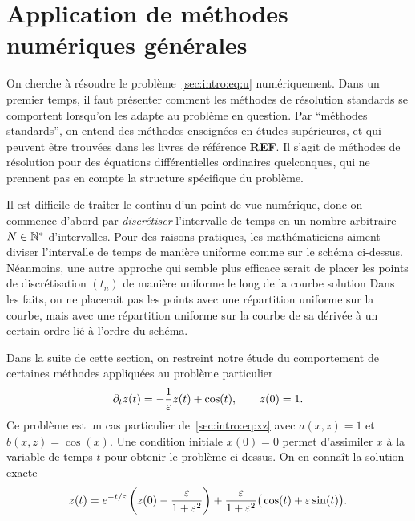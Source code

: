 \section*{Application de méthodes numériques générales}

On cherche à résoudre le problème~\eqref{sec:intro:eq:u} numériquement.
Dans un premier temps, il faut présenter comment les méthodes de
résolution standards se comportent lorsqu'on les adapte au problème en
question. Par \enquote{méthodes standards}, on entend des méthodes
enseignées en études supérieures, et qui peuvent être trouvées dans les
livres de référence \textbf{REF}. Il
s'agit de méthodes de résolution pour des équations différentielles
ordinaires quelconques, qui ne prennent pas en compte la structure
spécifique du problème. 


Il est difficile de traiter le continu d'un point de vue numérique, donc
on commence d'abord par \textit{discrétiser} l'intervalle de temps en un
nombre arbitraire $N \in \mathbb{N}^*$ d'intervalles.
%
%
\noindent%
Pour des raisons pratiques, les mathématiciens aiment diviser
l'intervalle de temps de manière uniforme comme sur le schéma ci-dessus.
Néanmoins, une autre approche qui semble plus efficace serait de placer
les points de discrétisation $(t_n)$ de manière uniforme le long de la
courbe solution 
%
%
\noindent%
Dans les faits, on ne placerait pas les points avec une répartition
uniforme sur la courbe, mais avec une répartition uniforme sur la courbe
de sa dérivée à un certain ordre lié à l'ordre du
schéma.


Dans la suite de cette section, on restreint notre étude du comportement
de certaines méthodes appliquées au problème particulier
\begin{equation} \label{sec:intro:eq:pb_ztest}
    \partial_t z(t) = -\frac{1}{\varepsilon}z(t) + \cos(t),
    \qquad z(0) = 1 .
\end{equation}
Ce problème est un cas particulier de~\eqref{sec:intro:eq:xz} avec
$a(x,z) = 1$ et $b(x,z) = \cos(x)$. Une condition initiale $x(0) = 0$
permet d'assimiler $x$ à la variable de temps $t$ pour obtenir le
problème ci-dessus. On en connaît la solution exacte 
\begin{equation*}
    z(t) = e^{-t/\varepsilon} \left( z(0) - \frac{\varepsilon}{1+\varepsilon^2} \right)
        + \frac{\varepsilon}{1 + \varepsilon^2} \big( \cos(t) + \varepsilon \sin(t) \big) .
\end{equation*}

